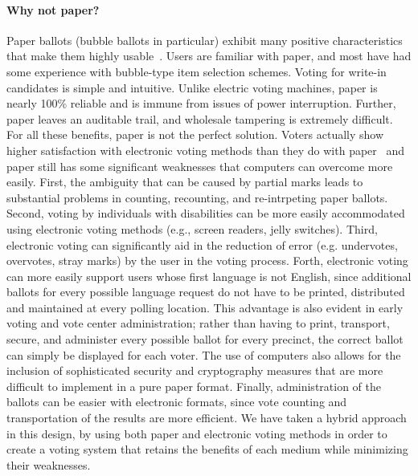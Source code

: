 \documentclass[letterpaper, 10pt, twocolumn]{article}
\begin{document}
\paragraph{Why not paper?}
Paper ballots (bubble ballots in particular) exhibit many positive characteristics that make them highly usable~\cite{hfes-06,byrne-baseline}. Users are familiar with paper, and most have had some experience with bubble-type item selection schemes. Voting for write-in candidates is simple and intuitive. Unlike electric voting machines, paper is nearly 100\% reliable and is immune from issues of power interruption. Further, paper leaves an auditable trail, and wholesale tampering is extremely difficult. 
For all these benefits, paper is not the perfect solution. Voters actually show higher satisfaction with electronic voting methods than they do with paper~\cite{everett08chi-dre-usability} and paper still has some significant weaknesses that computers can overcome more easily. 
First, the ambiguity that can be caused by partial marks leads to substantial problems in counting, recounting, and re-intrpeting paper ballots.
Second, voting by individuals with disabilities can be more easily accommodated using electronic voting methods (e.g., screen readers, jelly switches).
Third, electronic voting can significantly aid in the reduction of error (e.g. undervotes, overvotes, stray marks) by the user in the voting process.
Forth, electronic voting can more easily support users whose first language is not English, since additional ballots for every possible language request do not have to be printed, distributed and maintained at every polling location. This advantage is also evident in early voting and vote center administration; rather than having to print, transport, secure, and administer every possible ballot for every precinct, the correct ballot can simply be displayed for each voter. The use of computers also allows for the inclusion of sophisticated security and cryptography measures that are more difficult to implement in a pure paper format.
Finally, administration of the ballots can be easier with electronic formats, since vote counting and transportation of the results are more efficient.
We have taken a hybrid approach in this design, by using both paper and electronic voting methods in order to create a voting system that retains the benefits of each medium while minimizing their weaknesses. 
\end{document}
